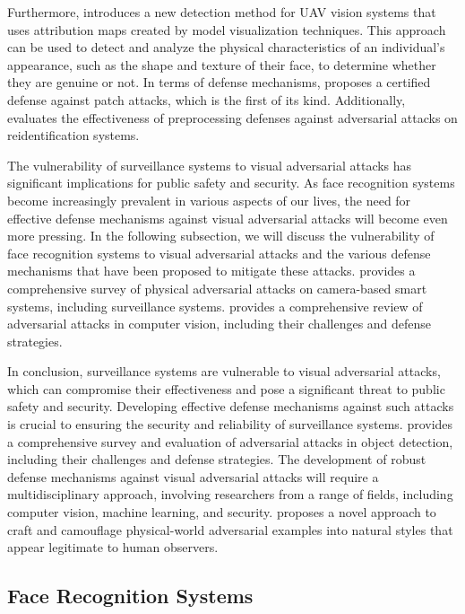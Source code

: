 \documentclass[11pt]{article}
\begin{document}
Furthermore, \cite{ref196} introduces a new detection method for UAV vision systems that uses attribution maps created by model visualization techniques. This approach can be used to detect and analyze the physical characteristics of an individual's appearance, such as the shape and texture of their face, to determine whether they are genuine or not. In terms of defense mechanisms, \cite{ref5} proposes a certified defense against patch attacks, which is the first of its kind. Additionally, \cite{ref197} evaluates the effectiveness of preprocessing defenses against adversarial attacks on reidentification systems.

The vulnerability of surveillance systems to visual adversarial attacks has significant implications for public safety and security. As face recognition systems become increasingly prevalent in various aspects of our lives, the need for effective defense mechanisms against visual adversarial attacks will become even more pressing. In the following subsection, we will discuss the vulnerability of face recognition systems to visual adversarial attacks and the various defense mechanisms that have been proposed to mitigate these attacks. \cite{ref15} provides a comprehensive survey of physical adversarial attacks on camera-based smart systems, including surveillance systems. \cite{ref7} provides a comprehensive review of adversarial attacks in computer vision, including their challenges and defense strategies.

In conclusion, surveillance systems are vulnerable to visual adversarial attacks, which can compromise their effectiveness and pose a significant threat to public safety and security. Developing effective defense mechanisms against such attacks is crucial to ensuring the security and reliability of surveillance systems. \cite{ref95} provides a comprehensive survey and evaluation of adversarial attacks in object detection, including their challenges and defense strategies. The development of robust defense mechanisms against visual adversarial attacks will require a multidisciplinary approach, involving researchers from a range of fields, including computer vision, machine learning, and security. \cite{ref198} proposes a novel approach to craft and camouflage physical-world adversarial examples into natural styles that appear legitimate to human observers.

\subsection{Face Recognition Systems}
\end{document}
